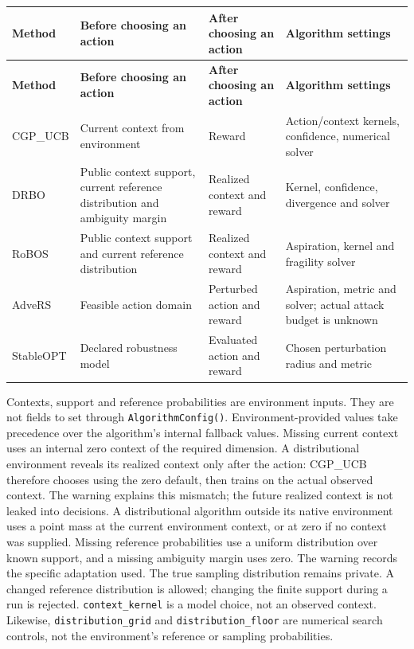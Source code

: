 \documentclass[10pt,a4paper]{article}
\begin{document}
{\small
\begin{longtable}{@{}>{\raggedright\arraybackslash}p{0.1200\dimexpr\linewidth-6\tabcolsep\relax}>{\raggedright\arraybackslash}p{0.3000\dimexpr\linewidth-6\tabcolsep\relax}>{\raggedright\arraybackslash}p{0.2300\dimexpr\linewidth-6\tabcolsep\relax}>{\raggedright\arraybackslash}p{0.3500\dimexpr\linewidth-6\tabcolsep\relax}@{}}
\toprule
\textbf{Method} & \textbf{Before choosing an action} & \textbf{After choosing an action} & \textbf{Algorithm settings} \\
\midrule\endfirsthead
\toprule
\textbf{Method} & \textbf{Before choosing an action} & \textbf{After choosing an action} & \textbf{Algorithm settings} \\
\midrule\endhead
CGP\_\allowbreak{}UCB & Current context from environment & Reward & Action/context kernels,\allowbreak{} confidence,\allowbreak{} numerical solver \\
DRBO & Public context support,\allowbreak{} current reference distribution and ambiguity margin & Realized context and reward & Kernel,\allowbreak{} confidence,\allowbreak{} divergence and solver \\
RoBOS & Public context support and current reference distribution & Realized context and reward & Aspiration,\allowbreak{} kernel and fragility solver \\
AdveRS & Feasible action domain & Perturbed action and reward & Aspiration,\allowbreak{} metric and solver; actual attack budget is unknown \\
StableOPT & Declared robustness model & Evaluated action and reward & Chosen perturbation radius and metric \\
\bottomrule
\end{longtable}
}

Contexts,\allowbreak{} support and reference probabilities are environment inputs. They are not fields to set through \texttt{Algorithm\allowbreak{}Config()}. Environment-provided values take precedence over the algorithm's internal fallback values. Missing current context uses an internal zero context of the required dimension. A distributional environment reveals its realized context only after the action: CGP\_\allowbreak{}UCB therefore chooses using the zero default,\allowbreak{} then trains on the actual observed context. The warning explains this mismatch; the future realized context is not leaked into decisions. A distributional algorithm outside its native environment uses a point mass at the current environment context,\allowbreak{} or at zero if no context was supplied. Missing reference probabilities use a uniform distribution over known support,\allowbreak{} and a missing ambiguity margin uses zero. The warning records the specific adaptation used. The true sampling distribution remains private. A changed reference distribution is allowed; changing the finite support during a run is rejected. \texttt{context\_\allowbreak{}kernel} is a model choice,\allowbreak{} not an observed context. Likewise,\allowbreak{} \texttt{distribution\_\allowbreak{}grid} and \texttt{distribution\_\allowbreak{}floor} are numerical search controls,\allowbreak{} not the environment's reference or sampling probabilities.
\end{document}
